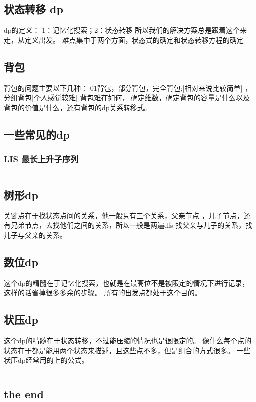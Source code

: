 \documentclass[a4paper,11pt]{article}
\begin{document}
\begin{CJK}{UTF8}{gbsn}
\section{状态转移 dp}
dp的定义：
1：记忆化搜索；2：状态转移
所以我们的解决方案总是跟着这个来走，从定义出发。
难点集中于两个方面，状态式的确定和状态转移方程的确定
\subsection{背包}
背包的问题主要以下几种：
01背包，部分背包，完全背包;[相对来说比较简单] ，分组背包[个人感觉较难]
背包难在如何， 确定维数，确定背包的容量是什么以及背包的价值是什么，还有背包的dp关系转移式。
\subsection{一些常见的dp}
\subsubsection{LIS 最长上升子序列}
\inputminted{c++}{../scoure/dp/longerxuelie.cpp}
\subsection{树形dp}
关键点在于找状态点间的关系，他一般只有三个关系，父亲节点
，儿子节点，还有兄弟节点，去找他们之间的关系，所以一般是两遍dfs
找父亲与儿子的关系，找儿子与父亲的关系。
\subsection{数位dp}
这个dp的精髓在于记忆化搜索，也就是在最高位不是被限定的情况下进行记录，这样的话省掉很多多余的步骤。
所有的出发点都处于这个目的。
\subsection{状压dp}
这个dp的精髓在于状态转移，不过能压缩的情况也是很限定的。
像什么每个点的状态在于都是能用两个状态来描述，且这些点不多，但是组合的方式很多。
一些状压dp经常用的上的公式。
\inputminted{c++}{../scoure/dp/zhuangtai.cpp}
\subsection{the end}
\end{CJK}
\end{document}
